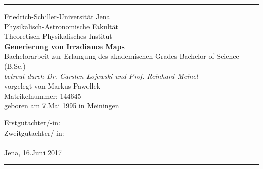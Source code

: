 \newcommand{\vrulefill}{\par\leaders\hbox{$\cdot$}\vfill}

\begin{titlepage}
	\thispagestyle{empty}
	\noindent

	\begin{minipage}{\textwidth}
		\rule{1.5pt}{0.3\textheight}%

		\vspace{5mm}
		\noindent
		{\Large Friedrich-Schiller-Universität Jena \\ Physikalisch-Astronomische Fakultät \\ Theoretisch-Physikalisches Institut \\[2\baselineskip]}
		{\Huge\bfseries Generierung von Irradiance Maps}\\[2\baselineskip]
		{\large Bachelorarbeit zur Erlangung des akademischen Grades Bachelor of Science (B.Sc.)\\}
		{\large \textit{betreut durch Dr. Carsten Lojewski und Prof. Reinhard Meinel}}\\[4\baselineskip]
		{\Large vorgelegt von Markus Pawellek} \\
		{\Large Matrikelnummer: 144645}\\
		{\large geboren am 7.Mai 1995 in Meiningen}

		\vspace{0.1\textheight} %
		\noindent
		{\Large Erstgutachter/-in:} \\
		{\Large Zweitgutachter/-in:} \\
		\\[\baselineskip] %
		Jena, 16.Juni 2017
		\vspace{5mm} \\
		\rule{1.5pt}{0.2\textheight}
	\end{minipage}

	\setcounter{page}{1}
\end{titlepage}
